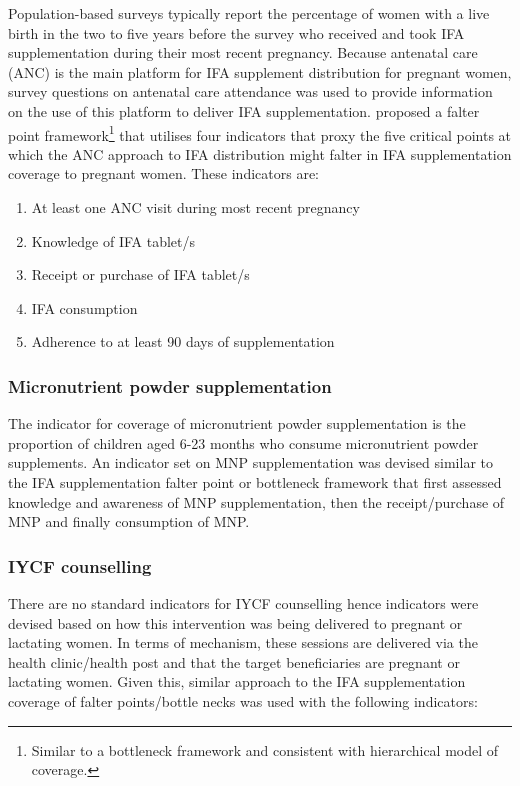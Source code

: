\documentclass[12pt,a4paper]{article}
\let\rmarkdownfootnote\footnote%
\def\footnote{\protect\rmarkdownfootnote}
\begin{document}
Population-based surveys typically report the percentage of women with a live birth in the two to five years before the survey who received and took IFA supplementation during their most recent pregnancy. Because antenatal care (ANC) is the main platform for IFA supplement distribution for pregnant women, survey questions on antenatal care attendance was used to provide information on the use of this platform to deliver IFA supplementation. \citet{Sununtnasuk:2015kb} proposed a falter point framework\footnote{Similar to a bottleneck framework and consistent with \citet{Tanahashi:1978we} hierarchical model of coverage.} that utilises four indicators that proxy the five critical points at which the ANC approach to IFA distribution might falter in IFA supplementation coverage to pregnant women. These indicators are:

\begin{enumerate}
\def\labelenumi{\arabic{enumi}.}
\item
  At least one ANC visit during most recent pregnancy
\item
  Knowledge of IFA tablet/s
\item
  Receipt or purchase of IFA tablet/s
\item
  IFA consumption
\item
  Adherence to at least 90 days of supplementation
\end{enumerate}

\hypertarget{micronutrient-powder-supplementation}{%
\subsubsection{Micronutrient powder supplementation}\label{micronutrient-powder-supplementation}}

The indicator for coverage of micronutrient powder supplementation is the proportion of children aged 6-23 months who consume micronutrient powder supplements. An indicator set on MNP supplementation was devised similar to the IFA supplementation falter point or bottleneck framework that first assessed knowledge and awareness of MNP supplementation, then the receipt/purchase of MNP and finally consumption of MNP.

\hypertarget{iycf-counselling}{%
\subsubsection{IYCF counselling}\label{iycf-counselling}}

There are no standard indicators for IYCF counselling hence indicators were devised based on how this intervention was being delivered to pregnant or lactating women. In terms of mechanism, these sessions are delivered via the health clinic/health post and that the target beneficiaries are pregnant or lactating women. Given this, similar approach to the IFA supplementation coverage of falter points/bottle necks was used with the following indicators:
\end{document}
